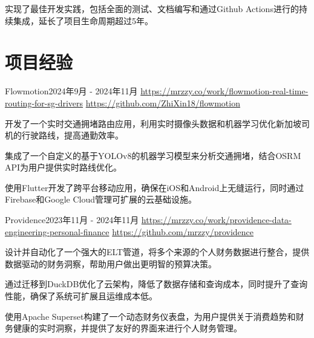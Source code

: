           \item{实现了最佳开发实践，包括全面的测试、文档编写和通过Github Actions进行的持续集成，延长了项目生命周期超过5年。}
        
      \resumeItemListEnd
  
  \resumeSubHeadingListEnd


\section{项目经验}
  \resumeSubHeadingListStart
    
      \resumeSubheading
        {Flowmotion}{2024年9月 - 2024年11月}
        {\href{https://mrzzy.co/work/flowmotion-real-time-routing-for-sg-drivers}{https://mrzzy.co/work/flowmotion-real-time-routing-for-sg-drivers}}
        {\href{https://github.com/ZhiXin18/flowmotion}{https://github.com/ZhiXin18/flowmotion}}
        \resumeItemListStart
          
            \item{开发了一个实时交通拥堵路由应用，利用实时摄像头数据和机器学习优化新加坡司机的行驶路线，提高通勤效率。}
          
            \item{集成了一个自定义的基于YOLOv8的机器学习模型来分析交通拥堵，结合OSRM API为用户提供实时路线优化。}
          
            \item{使用Flutter开发了跨平台移动应用，确保在iOS和Android上无缝运行，同时通过Firebase和Google Cloud管理可扩展的云基础设施。}
          
        \resumeItemListEnd
    
      \resumeSubheading
        {Providence}{2023年11月 - 2024年11月}
        {\href{https://mrzzy.co/work/providence-data-engineering-personal-finance}{https://mrzzy.co/work/providence-data-engineering-personal-finance}}
        {\href{https://github.com/mrzzy/providence}{https://github.com/mrzzy/providence}}
        \resumeItemListStart
          
            \item{设计并自动化了一个强大的ELT管道，将多个来源的个人财务数据进行整合，提供数据驱动的财务洞察，帮助用户做出更明智的预算决策。}
          
            \item{通过迁移到DuckDB优化了云架构，降低了数据存储和查询成本，同时提升了查询性能，确保了系统可扩展且运维成本低。}
          
            \item{使用Apache Superset构建了一个动态财务仪表盘，为用户提供关于消费趋势和财务健康的实时洞察，并提供了友好的界面来进行个人财务管理。}
          
